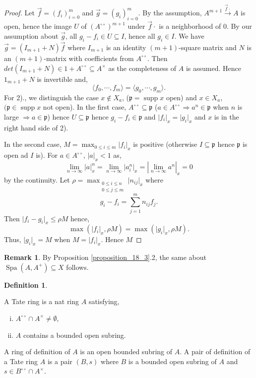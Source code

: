 \documentclass[10pt]{article}
\numberwithin{equation}{section}
\theoremstyle{definition}
\newtheorem{definition}{Definition}[subsection]
\newtheorem{remark}{Remark}[subsection]
\DeclareMathOperator{\supp}{supp}
\DeclareMathOperator{\Spa}{Spa}
\newcommand{\p}[0]{\mathfrak{p}}
\newcommand{\ab}[1]{\vert #1 \vert}
\newcommand{\dcirc}[0]{{\circ\circ}}
\begin{document}
\begin{proof}
    Let $\vec{f}=(f_i)_{i=0}^m$ and $\vec{g}=(g_i)_{i=0}^m$. By the assumption, $A^{m+1}\stackrel{\vec{f}\cdot}{\to}A$ is open, hence the image $U$ of $(A^\dcirc)^{m+1}$ under $\vec{f}\cdot$ is a neighborhood of $0$. By our assumption about $\vec{g}$, all $g_i-f_i\in U\subseteq I$, hence all $g_i\in I$. We have $\vec{g} = (I_{m+1}+N)\vec{f}$ where
    $I_{m+1}$ is an identity $(m+1)$-square matrix and $N$ is an $(m+1)$-matrix with coefficients from $A^\dcirc$. Then $det(I_{m+1}+N)\in 1+A^\dcirc\subseteq A^\times$ as the completeness of $A$ is assumed. Hence $1_{m+1}+N$ is invertible and,
    \begin{equation*}
        \langle f_0,\cdots,f_m\rangle = \langle g_0,\cdots,g_m\rangle.
    \end{equation*}
    For 2)., we distinguish the case $x\not\in X_a$, ($\p=\supp x$ open) and $x\in X_a$, $(\p\in\supp x$ not open).
    In the first case, $A^\dcirc\subseteq\p$ ($a\in A^\dcirc\Rightarrow a^n\in\p$ when $n$ is large $\Rightarrow a\in\p$) hence $U\subseteq \p$ hence $g_i-f_i\in\p$ and $\ab{f_i}_x=\ab{g_i}_x$ and $x$ is in the right hand side of 2).
    \par In the second case, $M= \max_{0\leq i\leq m}\ab{f_i}_x$ is positive (otherwise $I\subseteq \p$ hence $\p$ is open ad $I$ is). For $a\in A^\dcirc$, $\ab{a}_x<1$ as,
    \begin{equation*}
        \lim_{n\to\infty}\ab{a}_x^n=\lim_{n\to\infty}\ab{a_i^n}_x = \left\vert \lim_{n\to\infty}a^n\right\vert_x = 0
    \end{equation*}
    by the continuity. Let $\rho = \max_{\substack{0\leq i\leq n\\0\leq j\leq m}}\ab{n_{ij}}_x$ where
    \begin{equation*}
        g_i - f_i = \sum_{j=1}^mn_{ij}f_j.
    \end{equation*}
    Then $\ab{f_i-g_i}_x\leq\rho M$ hence,
    \begin{equation*}
        \max(\ab{f_i}_{x},\rho M) = \max(\ab{g_i}_x,\rho M).
    \end{equation*}
    Thus, $\ab{g_i}_x=M$ when $M=\ab{f_i}_x$. Hence $M$
\end{proof}

\begin{remark}
    By Proposition \ref{proposition_18_3}.2, the same about $\Spa(A,A^+)\subseteq X$ follows.
\end{remark}

\begin{definition}
    \label{definition_18_5}

    A Tate ring
    is a nat ring $A$ satisfying,
    \begin{enumerate}[i.]
        \item $A^\dcirc\cap A^\times\not=\emptyset$,
        \item $A$ contains a bounded open subring.
    \end{enumerate}
    A ring of definition of $A$ is an open bounded subring of $A$. A pair of definition of a Tate ring $A$ is a pair $(B,s)$ where $B$ is a bounded open subring of $A$ and $s\in B^{\dcirc}\cap A^\times$.
\end{definition}
\end{document}
